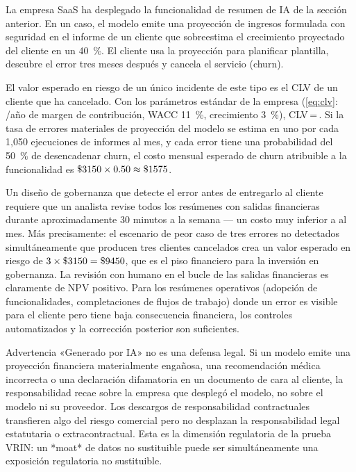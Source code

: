 \begin{example}
La empresa SaaS ha desplegado la funcionalidad de resumen de IA de la sección anterior. En un caso,
el modelo emite una proyección de ingresos formulada con seguridad en el informe de un cliente que
sobreestima el crecimiento proyectado del cliente en un \qty{40}{\percent}. El cliente usa la
proyección para planificar plantilla, descubre el error tres meses después y cancela el servicio (churn).

El valor esperado en riesgo de un único incidente de este tipo es el CLV de un cliente que ha
cancelado. Con los parámetros estándar de la empresa (\cref{eq:clv}: /año de margen de
contribución, WACC \qty{11}{\percent}, crecimiento \qty{3}{\percent}), CLV\,=\,. Si la
tasa de errores materiales de proyección del modelo se estima en uno por cada 1{,}050 ejecuciones
de informes al mes, y cada error tiene una probabilidad del \qty{50}{\percent} de desencadenar
churn, el costo mensual esperado de churn atribuible a la funcionalidad es \(\$\num{3150}\times 0.50\approx\$\num{1575}\).

Un diseño de gobernanza que detecte el error antes de entregarlo al cliente requiere que un analista
revise todos los resúmenes con salidas financieras durante aproximadamente 30 minutos a la semana —
un costo muy inferior a  al mes. Más precisamente: el escenario de peor caso de tres
errores no detectados simultáneamente que producen tres clientes cancelados crea un valor esperado
en riesgo de \(3\times\$\num{3150}=\$\num{9450}\), que es el piso financiero para la inversión en
gobernanza. La revisión con humano en el bucle de las salidas financieras es claramente de NPV
positivo. Para los resúmenes operativos (adopción de funcionalidades, completaciones de flujos de
trabajo) donde un error es visible para el cliente pero tiene baja consecuencia financiera, los
controles automatizados y la corrección posterior son suficientes.
\end{example}

\begin{admonition}{Advertencia}
«Generado por IA» no es una defensa legal. Si un modelo emite una proyección financiera
materialmente engañosa, una recomendación médica incorrecta o una declaración difamatoria en un
documento de cara al cliente, la responsabilidad recae sobre la empresa que desplegó el modelo, no
sobre el modelo ni su proveedor. Los descargos de responsabilidad contractuales transfieren algo
del riesgo comercial pero no desplazan la responsabilidad legal estatutaria o extracontractual.
Esta es la dimensión regulatoria de la prueba VRIN: un *moat* de datos no sustituible puede ser
simultáneamente una exposición regulatoria no sustituible.
\end{admonition}

